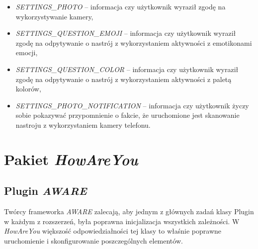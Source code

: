 \begin{itemize}
\begin{itemize}
		\item \textit{SETTINGS\_PHOTO} -- informacja czy użytkownik wyraził zgodę na wykorzystywanie kamery,
		
		\item \textit{SETTINGS\_QUESTION\_EMOJI} -- informacja czy użytkownik wyraził zgodę na odpytywanie o nastrój z wykorzystaniem aktywności z emotikonami emocji,
		
		\item \textit{SETTINGS\_QUESTION\_COLOR} -- informacja czy użytkownik wyraził zgodę na odpytywanie o nastrój z wykorzystaniem aktywności z paletą kolorów,
		
		\item \textit{SETTINGS\_PHOTO\_NOTIFICATION} -- informacja czy użytkownik życzy sobie pokazywać przypomnienie o fakcie, że uruchomione jest skanowanie nastroju z wykorzystaniem kamery telefonu.
	\end{itemize}
\end{itemize}


\section{Pakiet \textit{HowAreYou}}
\label{sec:pakietHowAreYou}


\subsection{Plugin \textit{AWARE}}

Twórcy frameworka \textit{AWARE} zalecają, aby jednym z głównych zadań klasy Plugin w każdym z rozszerzeń, była poprawna inicjalizacja wszystkich zależności\cite{AwareFramework}. W \textit{HowAreYou} większość odpowiedziałności tej klasy to właśnie poprawne uruchomienie i skonfigurowanie poszczególnych elementów.

